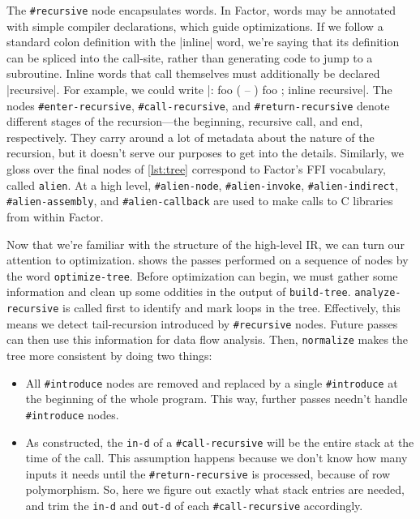 The \Verb|#recursive| node encapsulates  words.  In
Factor, words may be annotated with simple compiler declarations, which guide
optimizations.  If we follow a standard colon definition with the
\factor|inline| word, we're saying that its definition can be spliced into the
call-site, rather than generating code to jump to a subroutine.  Inline words
that call themselves must additionally be declared \factor|recursive|.  For
example, we could write
%
\factor|: foo ( -- ) foo ; inline recursive|.
%
The nodes \Verb|#enter-recursive|, \Verb|#call-recursive|, and
\Verb|#return-recursive| denote different stages of the recursion---the
beginning, recursive call, and end, respectively.  They carry around a lot of
metadata about the nature of the recursion, but it doesn't serve our purposes
to get into the details.  Similarly, we gloss over the final nodes of
\vref{lst:tree} correspond to Factor's \gls{FFI} vocabulary, called
\Verb|alien|.  At a high level, \Verb|#alien-node|, \Verb|#alien-invoke|,
\Verb|#alien-indirect|, \Verb|#alien-assembly|, and
\Verb|#alien-callback| are used to make calls to C libraries from within
Factor.


Now that we're familiar with the structure of the high-level \gls{IR}, we can
turn our attention to optimization.   shows the passes
performed on a sequence of nodes by the word \Verb|optimize-tree|.  Before
optimization can begin, we must gather some information and clean up some
oddities in the output of \Verb|build-tree|.  \Verb|analyze-recursive| is
called first to identify and mark loops in the tree.  Effectively, this means
we detect tail-recursion introduced by \Verb|#recursive| nodes.  Future
passes can then use this information for data flow analysis.  Then,
\Verb|normalize| makes the tree more consistent by doing two things:
%
\begin{itemize}
%
  \item All \Verb|#introduce| nodes are removed and replaced by a single
        \Verb|#introduce| at the beginning of the whole program.  This way,
        further passes needn't handle \Verb|#introduce| nodes.
%
  \item As constructed, the \Verb|in-d| of a \Verb|#call-recursive| will be
        the entire stack at the time of the call.  This assumption happens
        because we don't know how many inputs it needs until the
        \Verb|#return-recursive| is processed, because of row polymorphism.
        So, here we figure out exactly what stack entries are needed, and trim
        the \Verb|in-d| and \Verb|out-d| of each \Verb|#call-recursive|
        accordingly.
%
\end{itemize}

